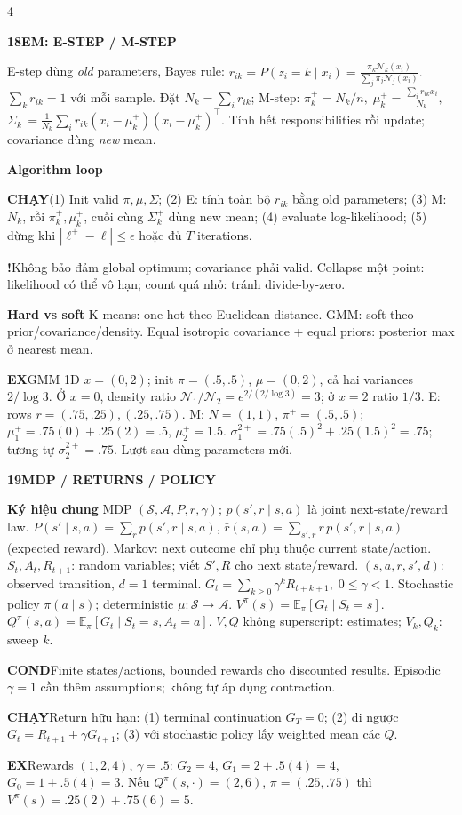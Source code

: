 \documentclass[a4paper]{article}
\newcommand{\topic}[2]{\par\addvspace{.8pt}%
  \begingroup\setlength{\fboxsep}{0.5pt}%
  \noindent\colorbox{structure}{\parbox{\dimexpr\linewidth-2\fboxsep\relax}{%
    \color{white}\fontsize{6.5}{7.1}\selectfont\bfseries #1\enspace #2}}%
  \endgroup\par\nobreak\vspace{.3pt}\nobreak}
\newcommand{\run}[1]{\key{CHẠY}#1}
\newcommand{\key}[1]{\par\textcolor{structure}{\textbf{#1}}\enspace}
\newcommand{\note}[4]{\par\begingroup\setlength{\fboxsep}{0.15pt}%
  \noindent\colorbox{#1}{\parbox{\dimexpr\linewidth-2\fboxsep\relax}{%
    \RaggedRight\textcolor{#2}{\textbf{#3}}\enspace #4}}%
  \endgroup\par}
\newcommand{\cond}[1]{\note{conditionbg}{condition}{COND}{#1}}
\newcommand{\trap}[1]{\note{warningbg}{warning}{!}{#1}}
\newcommand{\ex}[1]{\note{examplebg}{example}{EX}{#1}}
\newcommand{\E}{\mathbb{E}}
\begin{document}
\begin{multicols*}{4}
\topic{18}{EM: E-STEP / M-STEP}
E-step dùng \emph{old} parameters, Bayes rule:
$r_{ik}=P(z_i=k\mid x_i)=\frac{\pi_k\mathcal N_k(x_i)}{\sum_j\pi_j\mathcal N_j(x_i)}.$
$\sum_kr_{ik}=1$ với mỗi sample. Đặt $N_k=\sum_ir_{ik}$; M-step:
$\pi_k^+=N_k/n,\; \mu_k^+=\frac{\sum_i r_{ik}x_i}{N_k},$ $ \Sigma_k^+=\frac1{N_k}\sum_i r_{ik}(x_i-\mu_k^+)(x_i-\mu_k^+)^\top.$
Tính hết responsibilities rồi update; covariance dùng \emph{new} mean.

\key{Algorithm loop}
\run{(1) Init valid $\pi,\mu,\Sigma$; (2) E: tính toàn bộ $r_{ik}$ bằng old parameters; (3) M: $N_k$, rồi $\pi_k^+,\mu_k^+$, cuối cùng $\Sigma_k^+$ dùng new mean; (4) evaluate log-likelihood; (5) dừng khi $|\ell^+-\ell|\le\epsilon$ hoặc đủ $T$ iterations.}
\trap{Không bảo đảm global optimum; covariance phải valid. Collapse một point: likelihood có thể vô hạn; count quá nhỏ: tránh divide-by-zero.}
\key{Hard vs soft}
K-means: one-hot theo Euclidean distance. GMM: soft theo prior/covariance/density. Equal isotropic covariance + equal priors: posterior max ở nearest mean.
\ex{GMM 1D $x=(0,2)$; init $\pi=(.5,.5)$, $\mu=(0,2)$, cả hai variances $2/\log3$. Ở $x=0$, density ratio $\mathcal N_1/\mathcal N_2=e^{2/(2/\log3)}=3$; ở $x=2$ ratio $1/3$. E: rows $r=(.75,.25),(.25,.75)$. M: $N=(1,1)$, $\pi^+=(.5,.5)$; $\mu_1^+=.75(0)+.25(2)=.5$, $\mu_2^+=1.5$. $\sigma_1^{2+}=.75(.5)^2+.25(1.5)^2=.75$; tương tự $\sigma_2^{2+}=.75$. Lượt sau dùng parameters mới.}

\topic{19}{MDP / RETURNS / POLICY}
\key{Ký hiệu chung}
MDP $(\mathcal S,\mathcal A,P,\bar r,\gamma)$; $p(s',r\mid s,a)$ là joint next-state/reward law.
$P(s'\mid s,a)=\sum_r p(s',r\mid s,a)$,
$\bar r(s,a)=\sum_{s',r}r\,p(s',r\mid s,a)$ (expected reward).
Markov: next outcome chỉ phụ thuộc current state/action.
$S_t,A_t,R_{t+1}$: random variables; viết $S',R$ cho next state/reward.
$(s,a,r,s',d)$: observed transition, $d=1$ terminal.
$G_t=\sum_{k\ge0}\gamma^kR_{t+k+1},\;0\le\gamma<1.$
Stochastic policy $\pi(a\mid s)$; deterministic $\mu:\mathcal S\to\mathcal A$.
$V^\pi(s)=\E_\pi[G_t\mid S_t=s].$
$Q^\pi(s,a)=\E_\pi[G_t\mid S_t=s,A_t=a].$
$V,Q$ không superscript: estimates; $V_k,Q_k$: sweep $k$.

\cond{Finite states/actions, bounded rewards cho discounted results. Episodic $\gamma=1$ cần thêm assumptions; không tự áp dụng contraction.}
\run{Return hữu hạn: (1) terminal continuation $G_T=0$; (2) đi ngược $G_t=R_{t+1}+\gamma G_{t+1}$; (3) với stochastic policy lấy weighted mean các $Q$.}
\ex{Rewards $(1,2,4)$, $\gamma=.5$: $G_2=4$, $G_1=2+.5(4)=4$, $G_0=1+.5(4)=3$. Nếu $Q^\pi(s,\cdot)=(2,6)$, $\pi=(.25,.75)$ thì $V^\pi(s)=.25(2)+.75(6)=5$.}


\end{multicols*}
\end{document}
